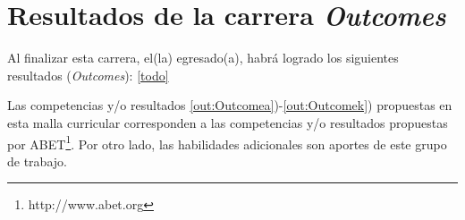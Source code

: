 \section{Resultados de la carrera {\it Outcomes}}\label{sec:outcomes}
Al finalizar esta carrera, el(la) egresado(a), habrá  logrado los siguientes resultados ({\it Outcomes}):
\ref{todo}

%

Las competencias y/o resultados \ref{out:Outcomea})-\ref{out:Outcomek}) propuestas en esta malla curricular corresponden a las 
competencias y/o resultados propuestas por ABET\footnote{http://www.abet.org}.
Por otro lado, las habilidades adicionales son aportes de este grupo de trabajo.
